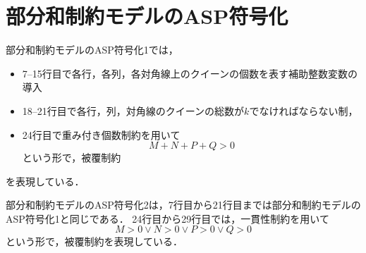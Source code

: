 \newpage
\section{部分和制約モデルのASP符号化}



部分和制約モデルのASP符号化1では，
\begin{itemize}
 \item 7--15行目で各行，各列，各対角線上のクイーンの個数を表す補助整数変数の導入
 \item 18--21行目で各行，列，対角線のクイーンの総数が$k$でなければならない制， 
 \item 24行目で重み付き個数制約を用いて
	$$M+N+P+Q>0$$
  という形で，被覆制約
\end{itemize}
を表現している．

\newpage


部分和制約モデルのASP符号化2は，7行目から21行目までは部分和制約モデルのASP符号化1と同じである．
24行目から29行目では，一貫性制約を用いて
$$M>0 \vee N>0 \vee P>0 \vee Q>0$$
という形で，被覆制約を表現している．

